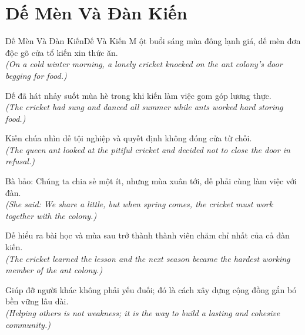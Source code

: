 \section{Dế Mèn Và Đàn Kiến}
\begin{truyen}{Dế Mèn Và Đàn Kiến}{Dế Và Kiến}
M ột buổi sáng mùa đông lạnh giá, dế mèn đơn độc gõ cửa tổ kiến xin thức ăn.\\
\textit{(On a cold winter morning, a lonely cricket knocked on the ant colony's door begging for food.)}

Dế đã hát nhảy suốt mùa hè trong khi kiến làm việc gom góp lương thực.\\
\textit{(The cricket had sung and danced all summer while ants worked hard storing food.)}

Kiến chúa nhìn dế tội nghiệp và quyết định không đóng cửa từ chối.\\
\textit{(The queen ant looked at the pitiful cricket and decided not to close the door in refusal.)}

Bà bảo: Chúng ta chia sẻ một ít, nhưng mùa xuân tới, dế phải cùng làm việc với đàn.\\
\textit{(She said: We share a little, but when spring comes, the cricket must work together with the colony.)}

Dế hiểu ra bài học và mùa sau trở thành thành viên chăm chỉ nhất của cả đàn kiến.\\
\textit{(The cricket learned the lesson and the next season became the hardest working member of the ant colony.)}

\end{truyen}
\begin{baihoc}
  Giúp đỡ người khác không phải yếu đuối; đó là cách xây dựng cộng đồng gắn bó bền vững lâu dài.\\
  \textit{(Helping others is not weakness; it is the way to build a lasting and cohesive community.)}
\end{baihoc}

